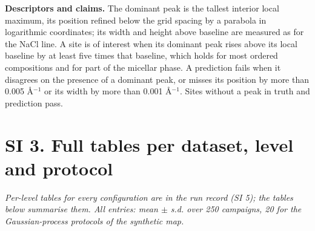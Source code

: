 \documentclass{iopjournal}
\begin{document}
\textbf{Descriptors and claims.} The dominant peak is the tallest interior local maximum, its position refined below the grid spacing by a parabola in logarithmic coordinates; its width and height above baseline are measured as for the NaCl line. A site is of interest when its dominant peak rises above its local baseline by at least five times that baseline, which holds for most ordered compositions and for part of the micellar phase. A prediction fails when it disagrees on the presence of a dominant peak, or misses its position by more than 0.005 \AA{}\ensuremath{^{-1}} or its width by more than 0.001 \AA{}\ensuremath{^{-1}}. Sites without a peak in truth and prediction pass.

\hypertarget{si-3.-full-tables-per-dataset-level-and-protocol}{%
\section*{SI 3. Full tables per dataset, level and protocol}\label{si-3.-full-tables-per-dataset-level-and-protocol}}

\emph{Per-level tables for every configuration are in the run record (SI 5); the tables below summarise them. All entries: mean \ensuremath{\pm} s.d. over 250 campaigns, 20 for the Gaussian-process protocols of the synthetic map.}
\end{document}
